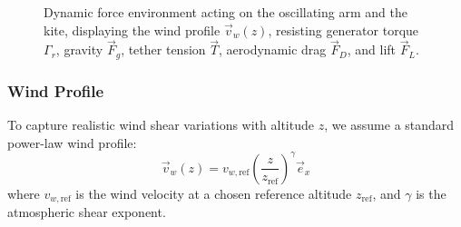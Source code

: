 \documentclass{article}
\begin{document}
\begin{figure}[htbp]
\caption{Dynamic force environment acting on the oscillating arm and the kite, displaying the wind profile $\vec{v}_w(z)$, resisting generator torque $\Gamma_r$, gravity $\vec{F}_g$, tether tension $\vec{T}$, aerodynamic drag $\vec{F}_D$, and lift $\vec{F}_L$.}
\label{fig:dynamics_config}
\end{figure}

\subsubsection{Wind Profile}
To capture realistic wind shear variations with altitude $z$, we assume a standard power-law wind profile:
\begin{equation}
\vec{v}_w(z) = v_{w, \text{ref}} \left(\frac{z}{z_{\text{ref}}}\right)^\gamma \vec{e}_x
\end{equation}
where $v_{w, \text{ref}}$ is the wind velocity at a chosen reference altitude $z_{\text{ref}}$, and $\gamma$ is the atmospheric shear exponent.
\end{document}
